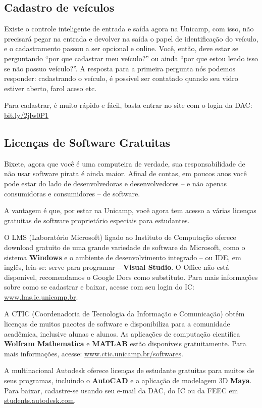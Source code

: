 \subsection{Cadastro de veículos}

Existe o controle inteligente de entrada e saída agora na Unicamp, com isso,
não precisará pegar na entrada e devolver na saída o papel de identificação do
veículo, e o cadastramento passou a ser opcional e online. Você, então, deve
estar se perguntando ``por que cadastrar meu veículo?'' ou ainda ``por que
estou lendo isso se não possuo veículo?''. A resposta para a primeira pergunta
nós podemos responder: cadastrando o veículo, é possível ser contatado quando
seu vidro estiver aberto, farol aceso etc.

Para cadastrar, é muito rápido e fácil, basta entrar no site com o login da
DAC: \url{bit.ly/2jlw0P1}

\subsection{Licenças de Software Gratuitas}

Bixete, agora que você é uma computeira de verdade, sua responsabilidade de não
usar software pirata é ainda maior. Afinal de contas, em poucos anos você pode
estar do lado de desenvolvedoras e desenvolvedores -- e não apenas consumidoras
e consumidores -- de software.

A vantagem é que, por estar na Unicamp, você agora tem acesso a várias licenças
gratuitas de software proprietário especiais para estudantes.

O LMS (Laboratório Microsoft) ligado ao Instituto de Computação oferece
download gratuito de uma grande variedade de software da Microsoft, como o
sistema \textbf{Windows} e o ambiente de desenvolvimento integrado -- ou IDE,
em inglês, leia-se: serve para programar -- \textbf{Visual Studio}. O Office
não está disponível, recomendamos o Google Docs como substituto. Para mais
informações sobre como se cadastrar e baixar, acesse com seu login do IC:
\url{www.lms.ic.unicamp.br}.

A CTIC (Coordenadoria de Tecnologia da Informação e Comunicação) obtém licenças
de muitos pacotes de software e disponibiliza para a comunidade acadêmica,
inclusive alunas e alunos. As aplicações de computação científica
\textbf{Wolfram Mathematica} e \textbf{MATLAB} estão disponíveis gratuitamente.
Para mais informações, acesse: \url{www.ctic.unicamp.br/softwares}.

A multinacional Autodesk oferece licenças de estudante gratuitas para muitos de
seus programas, incluindo o \textbf{AutoCAD} e a aplicação de modelagem 3D
\textbf{Maya}. Para baixar, cadastre-se usando seu e-mail da DAC, do IC ou da
FEEC em \url{students.autodesk.com}.


